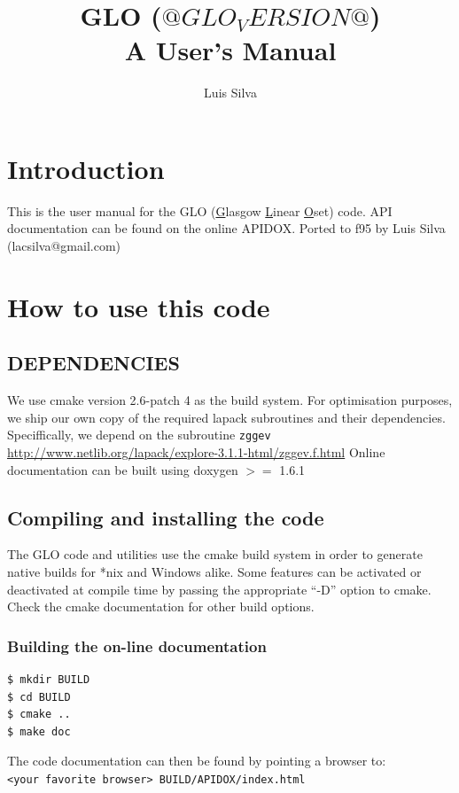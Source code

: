\documentclass[a4paper,10pt]{book}
\title{GLO ($@GLO_VERSION@$) \\ A User's Manual}
\author{Luis Silva}
\begin{document}

\maketitle

\clearpage{}

\tableofcontents

\clearpage{}
\chapter*{Introduction}
This is the user manual for the GLO (\underline{G}lasgow \underline{L}inear \underline{O}set) code.
API documentation can be found on the online APIDOX.
Ported to f95 by Luis Silva (lacsilva@gmail.com)

\chapter{How to use this code}

\section{DEPENDENCIES}
We use cmake version 2.6-patch 4 as the build system.
For optimisation purposes, we ship our own copy of the required lapack
subroutines and their dependencies. Speciffically, we depend on the subroutine
\verb|zggev| \url{http://www.netlib.org/lapack/explore-3.1.1-html/zggev.f.html}
Online documentation can be built using doxygen $>=$ 1.6.1

\section{Compiling and installing the code}
The GLO code and utilities use the cmake build system in order to generate
native builds for *nix and Windows alike. Some features can be activated or
deactivated at compile time by passing the appropriate ``-D'' option to cmake.
Check the cmake documentation \citep{CMakeDox} for other build options.

\subsection{Building the on-line documentation}
\begin{verbatim}
$ mkdir BUILD
$ cd BUILD
$ cmake ..
$ make doc
\end{verbatim}
The code documentation can then be found by pointing a browser
to:\\
\verb|<your favorite browser> BUILD/APIDOX/index.html|
\end{document}
